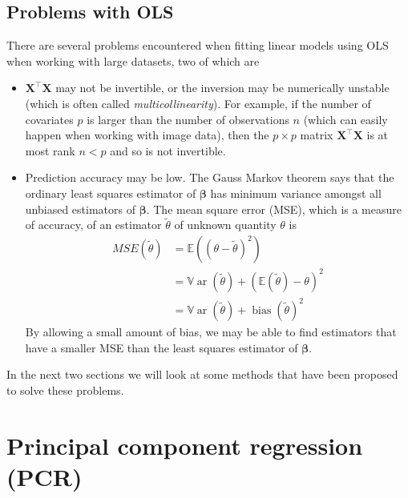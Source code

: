 \documentclass[
]{book}
\theoremstyle{definition}
\theoremstyle{definition}
\theoremstyle{definition}
\theoremstyle{definition}
\theoremstyle{remark}
\begin{document}
\hypertarget{problems-with-ols}{%
\subsection{Problems with OLS}\label{problems-with-ols}}

There are several problems encountered when fitting linear models using OLS when working with large datasets, two of which are

\begin{itemize}
\item
  \(\mathbf X^\top \mathbf X\) may not be invertible, or the inversion may be numerically unstable (which is often called \emph{multicollinearity}). For example, if the number of covariates \(p\) is larger than the number of observations \(n\) (which can easily happen when working with image data), then the \(p \times p\) matrix \(\mathbf X^\top \mathbf X\) is at most rank \(n<p\) and so is not invertible.
\item
  Prediction accuracy may be low. The Gauss Markov theorem says that the ordinary least squares estimator of \(\boldsymbol \beta\) has minimum variance amongst all unbiased estimators of \(\boldsymbol \beta\). The mean square error (MSE), which is a measure of accuracy, of an estimator \(\tilde{\theta}\) of unknown quantity \(\theta\) is
  \begin{align*}
  MSE(\tilde{\theta}) &= {\mathbb{E}}((\theta - \tilde{\theta})^2)\\
  &={\mathbb{V}\operatorname{ar}}(\tilde{\theta})+ ({\mathbb{E}}(\tilde{\theta})- \theta)^2\\
  &={\mathbb{V}\operatorname{ar}}(\tilde{\theta})+ \operatorname{bias}(\tilde{\theta})^2
  \end{align*}
  By allowing a small amount of bias, we may be able to find estimators that have a smaller MSE than the least squares estimator of \(\boldsymbol \beta\).
\end{itemize}

In the next two sections we will look at some methods that have been proposed to solve these problems.

\hypertarget{principal-component-regression-pcr}{%
\section{Principal component regression (PCR)}\label{principal-component-regression-pcr}}
\end{document}
